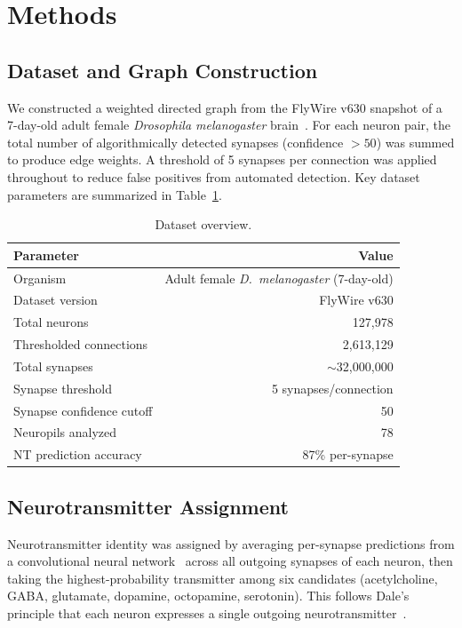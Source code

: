 \documentclass[11pt]{article}
\begin{document}
\section{Methods}

\subsection{Dataset and Graph Construction}

We constructed a weighted directed graph from the FlyWire v630 snapshot of a 7-day-old adult female \emph{Drosophila melanogaster} brain~\citep{dorkenwald2024flywire}.  For each neuron pair, the total number of algorithmically detected synapses (confidence $> 50$) was summed to produce edge weights.  A threshold of 5 synapses per connection was applied throughout to reduce false positives from automated detection.  Key dataset parameters are summarized in Table~\ref{tab:dataset}.

\begin{table}[ht]
\centering
\caption{Dataset overview.}
\label{tab:dataset}
\begin{tabular}{@{}lr@{}}
\toprule
Parameter & Value \\
\midrule
Organism & Adult female \emph{D.\ melanogaster} (7-day-old) \\
Dataset version & FlyWire v630 \\
Total neurons & 127,978 \\
Thresholded connections & 2,613,129 \\
Total synapses & $\sim$32,000,000 \\
Synapse threshold & 5 synapses/connection \\
Synapse confidence cutoff & 50 \\
Neuropils analyzed & 78 \\
NT prediction accuracy & 87\% per-synapse \\
\bottomrule
\end{tabular}
\end{table}

\subsection{Neurotransmitter Assignment}

Neurotransmitter identity was assigned by averaging per-synapse predictions from a convolutional neural network~\citep{eckstein2024neurotransmitter} across all outgoing synapses of each neuron, then taking the highest-probability transmitter among six candidates (acetylcholine, GABA, glutamate, dopamine, octopamine, serotonin).  This follows Dale's principle that each neuron expresses a single outgoing neurotransmitter~\citep{dale1935pharmacology}.
\end{document}
